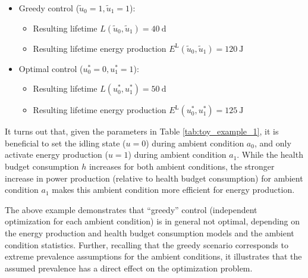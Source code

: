 \documentclass{article}
\begin{document}
    \begin{itemize}
        \item Greedy control ($\tilde{u}_0 = 1, \tilde{u}_1 = 1$):
        \begin{itemize}
            \item Resulting lifetime $L(\tilde{u}_0, \tilde{u}_1) = 40\ \text{d}$ 
            \item Resulting lifetime energy production $E^\text{L}(\tilde{u}_0, \tilde{u}_1) = 120\ \text{J}$
        \end{itemize}
        \item Optimal control ($u^*_0 = 0, u^*_1 = 1$):
        \begin{itemize}
            \item Resulting lifetime $L(u^*_0, u^*_1) = 50\ \text{d}$
            \item Resulting lifetime energy production $E^\text{L}(u^*_0, u^*_1) = 125\ \text{J}$
        \end{itemize}
    \end{itemize}

    It turns out that, given the parameters in Table \ref{tab:toy_example_1}, it is beneficial to set the idling state ($u = 0$) during ambient condition $a_0$, and only activate energy production ($u = 1$) during ambient condition $a_1$. While the health budget consumption $h$ increases for both ambient conditions, the stronger increase in power production (relative to health budget consumption) for ambient condition $a_1$ makes this ambient condition more efficient for energy production.

    The above example demonstrates that ``greedy'' control (independent optimization for each ambient condition) is in general not optimal, depending on the energy production and health budget consumption models and the ambient condition statistics. Further, recalling that the greedy scenario corresponds to extreme prevalence assumptions for the ambient conditions, it illustrates that the assumed prevalence has a direct effect on the optimization problem.
\end{document}
